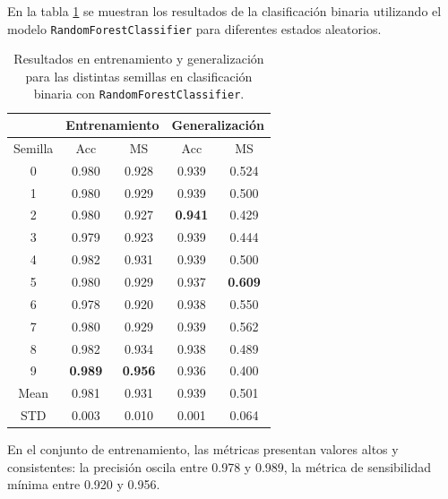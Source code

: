 En la tabla \ref{tabla:rf_bin} se muestran los resultados de la clasificación binaria utilizando el modelo \texttt{RandomForestClassifier} para diferentes estados aleatorios.

\begin{table}[H]
	\centering
	\begin{tabular}{ |c|c|c|c|c| }
		\hline
		\rowcolor{LightCyan}
		 & \multicolumn{2}{c|}{Entrenamiento} & \multicolumn{2}{c|}{Generalización} \\
		\hline
		\rowcolor{LightCyan}
		 Semilla & Acc & MS & Acc & MS \\
		\hline
		0    & 0.980          & 0.928          & 0.939          & 0.524          \\
		1    & 0.980          & 0.929          & 0.939          & 0.500          \\
		2    & 0.980          & 0.927          & \textbf{0.941} & 0.429          \\
		3    & 0.979          & 0.923          & 0.939          & 0.444          \\
		4    & 0.982          & 0.931          & 0.939          & 0.500          \\
		5    & 0.980          & 0.929          & 0.937          & \textbf{0.609} \\
		6    & 0.978          & 0.920          & 0.938          & 0.550          \\
		7    & 0.980          & 0.929          & 0.939          & 0.562          \\
		8    & 0.982          & 0.934          & 0.938          & 0.489          \\
		9    & \textbf{0.989} & \textbf{0.956} & 0.936          & 0.400          \\
		Mean & 0.981          & 0.931          & 0.939          & 0.501          \\
		STD  & 0.003          & 0.010          & 0.001          & 0.064          \\
		\hline
	\end{tabular}
	\caption{Resultados en entrenamiento y generalización para las distintas semillas en clasificación binaria con \texttt{RandomForestClassifier}.}
	\label{tabla:rf_bin}
\end{table}

En el conjunto de entrenamiento, las métricas presentan valores altos y consistentes: la precisión oscila entre 0.978 y 0.989, la métrica de sensibilidad mínima entre 0.920 y 0.956.

\vspace{1em}


